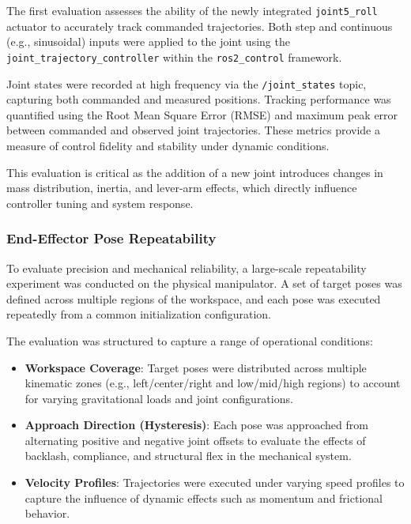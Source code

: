 \documentclass[conference]{IEEEtran}
\begin{document}
	The first evaluation assesses the ability of the newly integrated \texttt{joint5\_roll} actuator to accurately track commanded trajectories. Both step and continuous (e.g., sinusoidal) inputs were applied to the joint using the \texttt{joint\_trajectory\_controller} within the \texttt{ros2\_control} framework.
	
	Joint states were recorded at high frequency via the \texttt{/joint\_states} topic, capturing both commanded and measured positions. Tracking performance was quantified using the Root Mean Square Error (RMSE) and maximum peak error between commanded and observed joint trajectories. These metrics provide a measure of control fidelity and stability under dynamic conditions.
	
	This evaluation is critical as the addition of a new joint introduces changes in mass distribution, inertia, and lever-arm effects, which directly influence controller tuning and system response.
	
	\subsubsection{End-Effector Pose Repeatability}
	
	To evaluate precision and mechanical reliability, a large-scale repeatability experiment was conducted on the physical manipulator. A set of target poses was defined across multiple regions of the workspace, and each pose was executed repeatedly from a common initialization configuration.
	
	The evaluation was structured to capture a range of operational conditions:
	
	\begin{itemize}
		\item \textbf{Workspace Coverage}: Target poses were distributed across multiple kinematic zones (e.g., left/center/right and low/mid/high regions) to account for varying gravitational loads and joint configurations.
		
		\item \textbf{Approach Direction (Hysteresis)}: Each pose was approached from alternating positive and negative joint offsets to evaluate the effects of backlash, compliance, and structural flex in the mechanical system.
		
		\item \textbf{Velocity Profiles}: Trajectories were executed under varying speed profiles to capture the influence of dynamic effects such as momentum and frictional behavior.
	\end{itemize}
	
\end{document}
